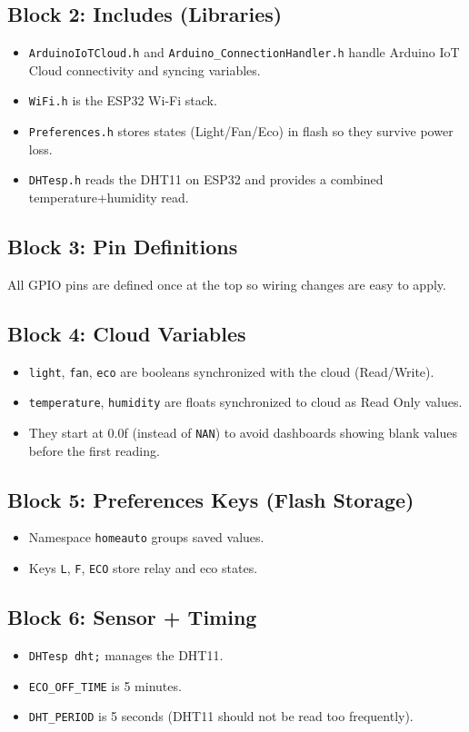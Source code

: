 \documentclass[12pt,a4paper]{article}
\begin{document}
\subsection{Block 2: Includes (Libraries)}
\begin{itemize}
\item \texttt{ArduinoIoTCloud.h} and \texttt{Arduino\_ConnectionHandler.h} handle Arduino IoT Cloud connectivity and syncing variables.
\item \texttt{WiFi.h} is the ESP32 Wi-Fi stack.
\item \texttt{Preferences.h} stores states (Light/Fan/Eco) in flash so they survive power loss.
\item \texttt{DHTesp.h} reads the DHT11 on ESP32 and provides a combined temperature+humidity read.
\end{itemize}

\subsection{Block 3: Pin Definitions}
All GPIO pins are defined once at the top so wiring changes are easy to apply.

\subsection{Block 4: Cloud Variables}
\begin{itemize}
\item \texttt{light}, \texttt{fan}, \texttt{eco} are booleans synchronized with the cloud (Read/Write).
\item \texttt{temperature}, \texttt{humidity} are floats synchronized to cloud as Read Only values.
\item They start at 0.0f (instead of \texttt{NAN}) to avoid dashboards showing blank values before the first reading.
\end{itemize}

\subsection{Block 5: Preferences Keys (Flash Storage)}
\begin{itemize}
\item Namespace \texttt{homeauto} groups saved values.
\item Keys \texttt{L}, \texttt{F}, \texttt{ECO} store relay and eco states.
\end{itemize}

\subsection{Block 6: Sensor + Timing}
\begin{itemize}
\item \texttt{DHTesp dht;} manages the DHT11.
\item \texttt{ECO\_OFF\_TIME} is 5 minutes.
\item \texttt{DHT\_PERIOD} is 5 seconds (DHT11 should not be read too frequently).
\end{itemize}
\end{document}
